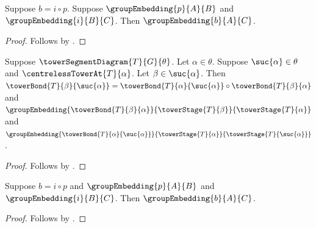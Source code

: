 \begin{proposition}\label{tower_embedding_comparison_from_factorization}
    Suppose $b=i\circ p$.
    Suppose $\groupEmbedding{p}{A}{B}$ and
        $\groupEmbedding{i}{B}{C}$.
    Then $\groupEmbedding{b}{A}{C}$.
\end{proposition}
\begin{proof}
    Follows by .
\end{proof}

\begin{proposition}\label{centreless_tower_successor_old_bond_factors}
    Suppose $\towerSegmentDiagram{T}{G}{\theta}$.
    Let $\alpha\in\theta$.
    Suppose $\suc{\alpha}\in\theta$ and
        $\centrelessTowerAt{T}{\alpha}$.
    Let $\beta\in\suc{\alpha}$.
    Then $\towerBond{T}{\beta}{\suc{\alpha}}=
            \towerBond{T}{\alpha}{\suc{\alpha}}\circ
                \towerBond{T}{\beta}{\alpha}$ and
        $\groupEmbedding
            {\towerBond{T}{\beta}{\alpha}}
            {\towerStage{T}{\beta}}
            {\towerStage{T}{\alpha}}$ and
        $\groupEmbedding
            {\towerBond{T}{\alpha}{\suc{\alpha}}}
            {\towerStage{T}{\alpha}}
            {\towerStage{T}{\suc{\alpha}}}$.
\end{proposition}
\begin{proof}
    Follows by
        .
\end{proof}

\begin{proposition}\label{centreless_tower_successor_factor_bundle_bridge}
    Suppose $b=i\circ p$ and
        $\groupEmbedding{p}{A}{B}$ and
        $\groupEmbedding{i}{B}{C}$.
    Then $\groupEmbedding{b}{A}{C}$.
\end{proposition}
\begin{proof}
    Follows by .
\end{proof}


